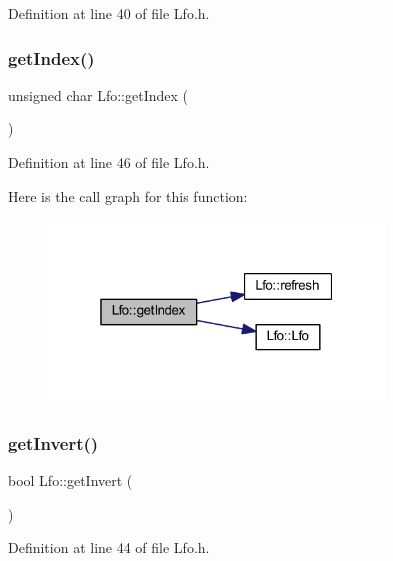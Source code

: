 Definition at line 40 of file Lfo.\+h.

\mbox{\label{class_lfo_a007a56fbcb5a5cf639dc397d35d6392f}} 
\subsubsection{\texorpdfstring{get\+Index()}{getIndex()}}
{\footnotesize\ttfamily unsigned char Lfo\+::get\+Index (\begin{DoxyParamCaption}{ }\end{DoxyParamCaption})\hspace{0.3cm}{\ttfamily [inline]}}



Definition at line 46 of file Lfo.\+h.

Here is the call graph for this function\+:
\nopagebreak
\begin{figure}[H]
\begin{center}
\leavevmode
\includegraphics[width=253pt]{d6/d5f/class_lfo_a007a56fbcb5a5cf639dc397d35d6392f_cgraph}
\end{center}
\end{figure}
\mbox{\label{class_lfo_af55fdb8ee75c2da369056a1b0720fe41}} 
\subsubsection{\texorpdfstring{get\+Invert()}{getInvert()}}
{\footnotesize\ttfamily bool Lfo\+::get\+Invert (\begin{DoxyParamCaption}{ }\end{DoxyParamCaption})\hspace{0.3cm}{\ttfamily [inline]}}



Definition at line 44 of file Lfo.\+h.


